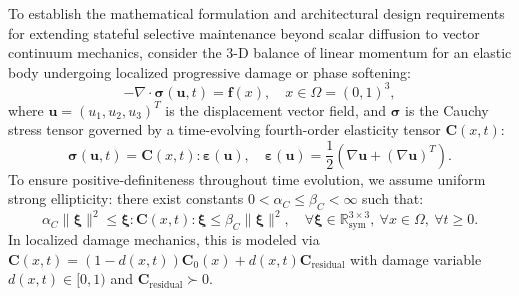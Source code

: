 \documentclass[preprint,12pt,3p]{elsarticle}
\begin{document}
To establish the mathematical formulation and architectural design requirements for extending stateful selective maintenance beyond scalar diffusion to vector continuum mechanics, consider the 3-D balance of linear momentum for an elastic body undergoing localized progressive damage or phase softening:
\begin{equation}
-\nabla \cdot \boldsymbol{\sigma}(\boldsymbol{u}, t) = \boldsymbol{f}(x), \quad x \in \Omega = (0, 1)^3,
\label{eq:elasticity_momentum}
\end{equation}
where $\boldsymbol{u} = (u_1, u_2, u_3)^T$ is the displacement vector field, and $\boldsymbol{\sigma}$ is the Cauchy stress tensor governed by a time-evolving fourth-order elasticity tensor $\mathbf{C}(x, t)$:
\begin{equation}
\boldsymbol{\sigma}(\boldsymbol{u}, t) = \mathbf{C}(x, t) : \boldsymbol{\varepsilon}(\boldsymbol{u}), \quad \boldsymbol{\varepsilon}(\boldsymbol{u}) = \frac{1}{2} \left( \nabla \boldsymbol{u} + (\nabla \boldsymbol{u})^T \right).
\end{equation}
To ensure positive-definiteness throughout time evolution, we assume uniform strong ellipticity: there exist constants $0 < \alpha_C \le \beta_C < \infty$ such that:
\begin{equation}
\alpha_C \|\boldsymbol{\xi}\|^2 \le \boldsymbol{\xi} : \mathbf{C}(x, t) : \boldsymbol{\xi} \le \beta_C \|\boldsymbol{\xi}\|^2, \quad \forall \boldsymbol{\xi} \in \mathbb{R}_{\text{sym}}^{3 \times 3}, \ \forall x \in \Omega, \ \forall t \ge 0.
\label{eq:strong_ellipticity}
\end{equation}
In localized damage mechanics, this is modeled via $\mathbf{C}(x, t) = (1 - d(x, t)) \mathbf{C}_0(x) + d(x, t) \mathbf{C}_{\text{residual}}$ with damage variable $d(x, t) \in [0, 1)$ and $\mathbf{C}_{\text{residual}} \succ 0$.
\end{document}
